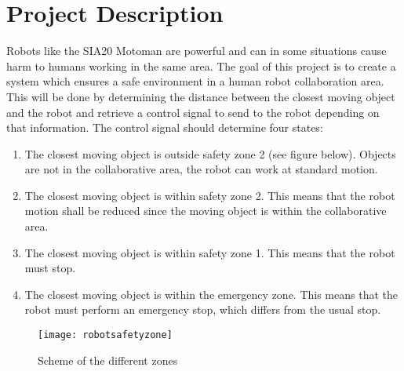 
\section{Project Description}
Robots like the SIA20 Motoman are powerful and can in some situations cause harm to humans working in the same area. The goal of this project is to create a system which ensures a safe environment in a human robot collaboration area. This will be done by determining the distance between the closest moving object and the robot and retrieve a control signal to send to the robot depending on that information. The control signal should determine four states:
\begin{enumerate}
\item The closest moving object is outside safety zone 2 (see figure below). Objects are not in the collaborative area, the robot can work at standard motion. 

\item The closest moving object is within safety zone 2. This means that the robot motion shall be reduced since the moving object is within the collaborative area.

\item The closest moving object is within safety zone 1. This means that the robot must stop.

\item The closest moving object is within the emergency zone. This means that the robot must perform an emergency stop, which differs from the usual stop. 
\end{enumerate}

\begin{figure}[H]
\begin{center}
\texttt{[image: robotsafetyzone]}
\caption{Scheme of the different zones}
\label{robotsafetyzone}
\end{center}
\end{figure}
